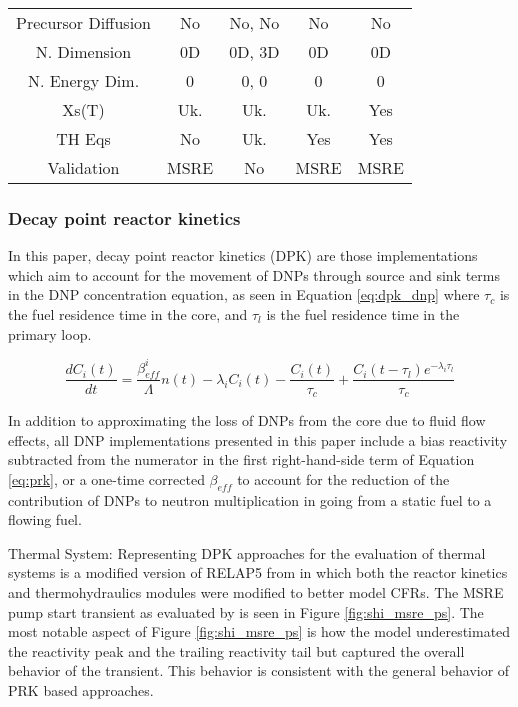 \documentclass[review]{elsarticle}
\begin{document}
\begin{table}[H]
\begin{center}
\begin{tabular}{|c c c c c|}
                Precursor Diffusion & No & No, No & No & No \\
                N. Dimension & 0D & 0D, 3D & 0D & 0D \\
                N. Energy Dim. & 0 & 0, 0 & 0 & 0 \\
                Xs(T) & Uk. & Uk. & Uk. & Yes \\
                TH Eqs & No & Uk. & Yes & Yes \\
                Validation & MSRE & No & MSRE & MSRE \\
            \hline
        \end{tabular}
    \end{center}
\end{table}

\subsubsection{Decay point reactor kinetics} \label{sssec:dpk}
In this paper,
decay point reactor kinetics (DPK) are those implementations
which aim to account for the movement of DNPs through source and sink terms
in the DNP concentration equation, as seen in Equation \ref{eq:dpk_dnp}
where $\tau_{c}$ is the fuel residence time in the core, and $\tau_{l}$ is the
fuel residence time in the primary loop.

\begin{equation}
    \label{eq:dpk_dnp}
    \frac{dC_{i}(t)}{dt} = \frac{\beta_{eff}^{i}}{\Lambda} n(t) -
        \lambda_{i} C_{i}(t) - \frac{C_{i}(t)}{\tau_{c}} +
        \frac{C_{i}(t - \tau_{l}) e^{-\lambda_{i} \tau_{l}}}{\tau_{c}}
\end{equation}

In addition to approximating the loss of DNPs from the core due to fluid
flow effects, all DNP implementations presented in this paper include
a bias reactivity subtracted from the numerator in the first right-hand-side
term of Equation \ref{eq:prk}, or a one-time corrected $\beta_{eff}$ to account
for the reduction of the contribution of DNPs to neutron multiplication in
going from a static fuel to a flowing fuel.

\par Thermal System: Representing DPK approaches for the evaluation of thermal
systems is a modified version of RELAP5 from \cite{shi_development_2016} in
which both the reactor kinetics and thermohydraulics modules were modified
to better model CFRs. The MSRE pump start transient as evaluated by
\cite{shi_development_2016} is seen in Figure \ref{fig:shi_msre_ps}. The most
notable aspect of Figure \ref{fig:shi_msre_ps} is how the model underestimated
the reactivity peak and the trailing reactivity tail but captured the
overall behavior of the transient. This behavior is consistent with the
general behavior of PRK based approaches.
\end{document}
